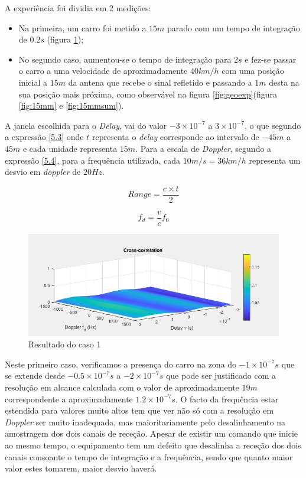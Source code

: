 A experiência foi dividia em 2 medições:
\begin{itemize}
\item Na primeira, um carro foi metido a $1 5m$ parado com um tempo de integração de $0.2 s$ (figura \ref{fig:15me});
\item No segundo caso, aumentou-se o tempo de integração para $2 s$ e fez-se passar o carro a uma velocidade de aproximadamente $40 km/h$ com uma posição inicial a $15m$ da antena que recebe o sinal refletido e passando a 
$1 m$ desta na sua posição mais próxima, como observável na figura \ref{fig:geoexp}(figura \ref{fig:15mm} e \ref{fig:15mmsum}). 
\end{itemize}

A janela escolhida para o \textit{Delay}, vai do valor $-3\times 10^{-7}$ a $3\times 10^{-7}$, o que segundo a expressão \ref{5.3} onde $t$ representa o \textit{delay} corresponde ao intervalo de $-45 m$ a $45 m$ e cada unidade representa $15 m$. Para a escala de \textit{Doppler}, segundo a expressão \ref{5.4}, para a frequência utilizada, cada $10 m/s = 36 km/h$ representa um desvio em \textit{doppler} de $20 Hz$.

\begin{equation} \label{5.3}
Range = \dfrac{c\times t}{2}
\end{equation}

\begin{equation} \label{5.4}
f_{d} = \dfrac{v}{c}f_{0}
\end{equation}

\begin{figure}[h]
\centering
\includegraphics[scale=0.5]{chapters/ch5/assets/15me}
\caption[Caso 1]{Resultado do caso 1}
\label{fig:15me}
\end{figure}

Neste primeiro caso, verificamos a presença do carro na zona do $-1\times 10^{-7}s$ que se extende desde $-0.5\times 10^{-7}s$ a $-2\times 10^{-7}s$ que pode ser justificado com a resolução em alcance calculada com o valor de aproximadamente $19 m$ correspondente a aproximadamente $1.2\times 10^{-7} s$. O facto da frequência estar estendida para valores muito altos tem que ver não só com a resolução em \textit{Doppler} ser muito inadequada, mas maioritariamente pelo desalinhamento na amostragem dos dois canais de receção. Apesar de existir um comando que inicie ao mesmo tempo, o equipamento tem um defeito que desalinha a receção dos dois canais consoante o tempo de integração e a frequência, sendo que quanto maior valor estes tomarem, maior desvio haverá.

